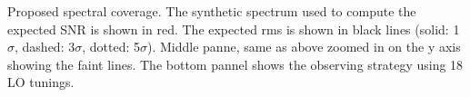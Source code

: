 \label{fig:setup}Proposed spectral coverage. The synthetic spectrum used to compute the expected SNR is shown in red. The expected rms is shown in black lines (solid: 1$\sigma$, dashed: 3$\sigma$, dotted: 5$\sigma$). Middle panne, same as above zoomed in on the y axis showing the faint lines. The bottom pannel shows the observing strategy using 18 LO tunings.